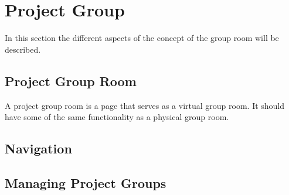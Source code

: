 \section{Project Group}
In this section the different aspects of the concept of the group room will be described.
\subsection{Project Group Room}
A project group room is a page that serves as a virtual group room. 
It should have some of the same functionality as a physical group room.


\subsection{Navigation}

\subsection{Managing Project Groups}